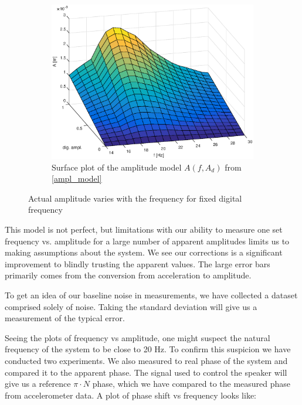 \documentclass[12pt,oneside,a4paper]{article}
\numberwithin{equation}{section}
\begin{document}
{{{{\begin{figure}[h]
\begin{subfigure}[t]{0.49\textwidth}
		\includegraphics[width=\textwidth]{surfplot}
		\caption{Surface plot of the amplitude model $A(f,A_{d})$ from \eqref{ampl_model}}
	\end{subfigure}
	\caption{Actual amplitude varies with the frequency for fixed digital frequency}
\end{figure}

 This model is not perfect, but limitations with our ability to measure one set frequency vs. amplitude for a large number of apparent amplitudes limits us to making assumptions about the system. We see our corrections is a significant improvement to blindly trusting the apparent values. The large error bars primarily comes from the conversion from acceleration to amplitude.

To get an idea of our baseline noise in measurements, we have collected a dataset comprised solely of noise. Taking the standard deviation will give us a measurement of the typical error. 

Seeing the plots of frequency vs amplitude, one might suspect the natural frequency of the system to be close to 20 Hz. To confirm this suspicion we have conducted two experiments. We also measured to real phase of the system and compared it to the apparent phase. The signal used to control the speaker will give us a reference $\pi\cdot N$ phase, which we have compared to the measured phase from accelerometer data. A plot of phase shift vs frequency looks like:
\begin{figure}[h]
	\centering
	\begin{subfigure}[t]{0.49\textwidth}
		

\end{subfigure}
\end{figure}}}}}
\end{document}
